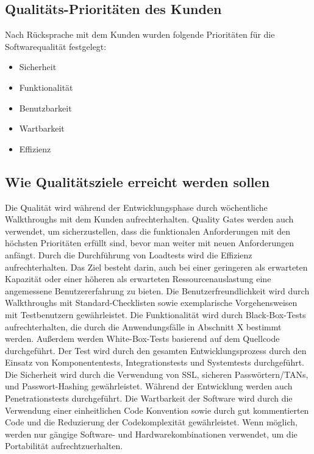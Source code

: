 	\subsection{Qualitäts-Prioritäten des Kunden}
		
    Nach Rücksprache mit dem Kunden wurden folgende Prioritäten für die Softwarequalität festgelegt:

		\begin{itemize}
			\item Sicherheit 
            \item Funktionalität
           	\item Benutzbarkeit
            \item Wartbarkeit
            \item Effizienz

		\end{itemize}

	\subsection{Wie Qualitätsziele erreicht werden sollen}
	
	Die Qualität wird während der Entwicklungsphase durch wöchentliche Walkthroughs mit dem Kunden aufrechterhalten. Quality Gates werden auch verwendet, um sicherzustellen, dass die funktionalen Anforderungen mit den höchsten Prioritäten erfüllt sind, bevor man weiter mit neuen Anforderungen anfängt.
	\linebreak
    Durch die Durchführung von Loadtests wird die Effizienz aufrechterhalten. Das Ziel besteht darin, auch bei einer geringeren als erwarteten Kapazität oder einer höheren als erwarteten Ressourcenauslastung eine angemessene Benutzererfahrung zu bieten. 
	\linebreak
	Die Benutzerfreundlichkeit wird durch Walkthroughs mit Standard-Checklisten sowie exemplarische Vorgehensweisen mit Testbenutzern gewährleistet.
	\linebreak
	Die Funktionalität wird durch Black-Box-Tests aufrechterhalten, die durch die Anwendungsfälle in Abschnitt X bestimmt werden. Außerdem werden White-Box-Tests basierend auf dem Quellcode durchgeführt. Der Test wird durch den gesamten Entwicklungsprozess durch den Einsatz von Komponententests, Integrationstests und Systemtests durchgeführt.
	\linebreak
	Die Sicherheit wird durch die Verwendung von SSL, sicheren Passwörtern/TANs, und Passwort-Hashing gewährleistet. Während der Entwicklung werden auch Penetrationstests durchgeführt.
	\linebreak
	Die Wartbarkeit der Software wird durch die Verwendung einer einheitlichen Code Konvention sowie durch gut kommentierten Code und die Reduzierung der Codekomplexität gewährleistet.
	\linebreak
	Wenn möglich, werden nur gängige Software- und Hardwarekombinationen verwendet, um die Portabilität aufrechtzuerhalten.
